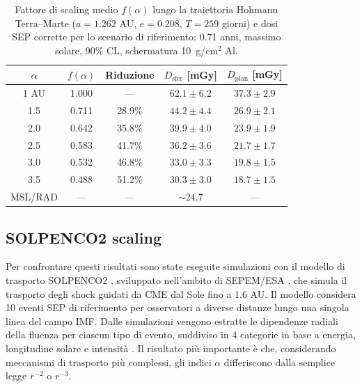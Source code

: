\documentclass[12pt]{report}
\begin{document}
\vspace{20pt}
\begin{table}[htbp]
\centering
\begin{tabular}{c c c c c}
\hline\hline
$\alpha$ & $f(\alpha)$ & Riduzione & $D_{\mathrm{sfer}}$ [mGy] & $D_{\mathrm{plan}}$ [mGy] \\
\hline
1 AU & 1.000 & ---    & $62.1 \pm 6.2$ & $37.3 \pm 2.9$ \\
\hline
1.5         & 0.711 & 28.9\% & $44.2 \pm 4.4$ & $26.9 \pm 2.1$ \\
2.0         & 0.642 & 35.8\% & $39.9 \pm 4.0$ & $23.9 \pm 1.9$ \\
2.5         & 0.583 & 41.7\% & $36.2 \pm 3.6$ & $21.7 \pm 1.7$ \\
3.0         & 0.532 & 46.8\% & $33.0 \pm 3.3$ & $19.8 \pm 1.5$ \\
3.5         & 0.488 & 51.2\% & $30.3 \pm 3.0$ & $18.7 \pm 1.5$ \\

\hline
MSL/RAD     & ---   & ---    & $\sim 24.7$      & ---             \\
\hline\hline
\end{tabular}
\caption{Fattore di scaling medio $f(\alpha)$ lungo la traiettoria Hohmann Terra--Marte
($a = 1.262$ AU, $e = 0.208$, $T = 259$ giorni) e dosi SEP corrette per lo scenario
di riferimento: 0.71 anni, massimo solare, 90\% CL, schermatura 10~g/cm$^2$ Al.}
\label{tab:scaling}
\end{table}
\clearpage


\subsection{SOLPENCO2 scaling}
\enlargethispage{3\baselineskip}
Per confrontare questi risultati sono state eseguite simulazioni con il modello di trasporto SOLPENCO2 \cite{SOLPENCO2}, sviluppato nell'ambito di SEPEM/ESA \cite{SEPEM}, che simula  il trasporto degli shock guidati da CME dal Sole fino a 1.6 AU. Il modello considera 10 eventi SEP di riferimento per osservatori a diverse distanze lungo una singola linea del campo IMF. Dalle simulazioni vengono estratte le dipendenze radiali della fluenza per ciascun tipo di evento, suddiviso in 4 categorie in base a energia, longitudine solare e intensità \cite{sepem_solpenco2}. Il risultato più importante è che, considerando meccanismi di trasporto più complessi, gli indici $\alpha$ differiscono dalla semplice legge $r^{-2}$ o $r^{-3}$.
\end{document}
